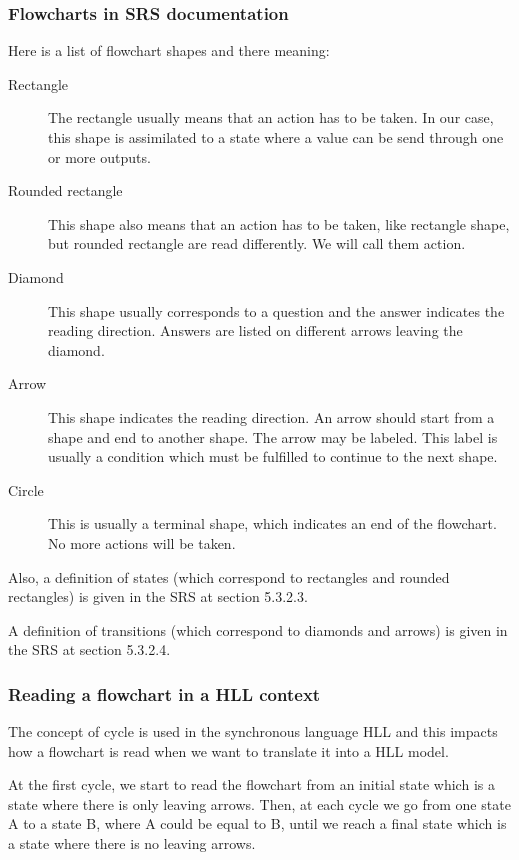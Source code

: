 \subsubsection{Flowcharts in SRS documentation}
\label{flowchart-definition}
Here is a list of flowchart shapes and there meaning:
\begin{description}
\item[Rectangle] The rectangle usually means that an action has to be
  taken. In our case, this shape is assimilated to a state where a
  value can be send through one or more outputs.
\item[Rounded rectangle] This shape also means that an action has to
  be taken, like rectangle shape, but rounded rectangle are read
  differently. We will call them action.
\item[Diamond] This shape usually corresponds to a question and the
  answer indicates the reading direction. Answers are listed on
  different arrows leaving the diamond.
\item[Arrow] This shape indicates the reading direction. An arrow
  should start from a shape and end to another shape. The arrow may be
  labeled. This label is usually a condition which must be fulfilled
  to continue to the next shape.
\item[Circle] This is usually a terminal shape, which indicates an end
  of the flowchart. No more actions will be taken.
\end{description}

Also, a definition of states (which correspond to rectangles and
rounded rectangles) is given in the SRS at section 5.3.2.3.

A definition of transitions (which correspond to diamonds and arrows)
is given in the SRS at section 5.3.2.4.

\subsubsection{Reading a flowchart in a HLL context}
\label{reading-a-flowchart}
The concept of cycle is used in the synchronous language HLL and this
impacts how a flowchart is read when we want to translate it into a
HLL model.

At the first cycle, we start to read the flowchart from an initial
state which is a state where there is only leaving arrows. Then, at
each cycle we go from one state A to a state B, where A could be equal
to B, until we reach a final state which is a state where there is no
leaving arrows.

